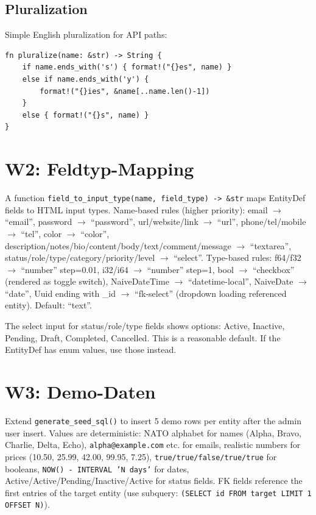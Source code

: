 \documentclass[11pt,a4paper]{article}
\begin{document}
\subsection{Pluralization}
Simple English pluralization for API paths:
\begin{lstlisting}[style=rust]
fn pluralize(name: &str) -> String {
    if name.ends_with('s') { format!("{}es", name) }
    else if name.ends_with('y') {
        format!("{}ies", &name[..name.len()-1])
    }
    else { format!("{}s", name) }
}
\end{lstlisting}

\section{W2: Feldtyp-Mapping}
A function \texttt{field\_to\_input\_type(name, field\_type) -> \&str} maps EntityDef fields to HTML input types. Name-based rules (higher priority): email $\to$ ``email'', password $\to$ ``password'', url/website/link $\to$ ``url'', phone/tel/mobile $\to$ ``tel'', color $\to$ ``color'', description/notes/bio/content/body/text/comment/message $\to$ ``textarea'', status/role/type/category/priority/level $\to$ ``select''. Type-based rules: f64/f32 $\to$ ``number'' step=0.01, i32/i64 $\to$ ``number'' step=1, bool $\to$ ``checkbox'' (rendered as toggle switch), NaiveDateTime $\to$ ``datetime-local'', NaiveDate $\to$ ``date'', Uuid ending with \_id $\to$ ``fk-select'' (dropdown loading referenced entity). Default: ``text''.

The select input for status/role/type fields shows options: Active, Inactive, Pending, Draft, Completed, Cancelled. This is a reasonable default. If the EntityDef has enum values, use those instead.

\section{W3: Demo-Daten}
Extend \texttt{generate\_seed\_sql()} to insert 5 demo rows per entity after the admin user insert. Values are deterministic: NATO alphabet for names (Alpha, Bravo, Charlie, Delta, Echo), \texttt{alpha@example.com} etc. for emails, realistic numbers for prices (10.50, 25.99, 42.00, 99.95, 7.25), \texttt{true/true/false/true/true} for booleans, \texttt{NOW() - INTERVAL 'N days'} for dates, Active/Active/Pending/Inactive/Active for status fields. FK fields reference the first entries of the target entity (use subquery: \texttt{(SELECT id FROM target LIMIT 1 OFFSET N)}).
\end{document}
